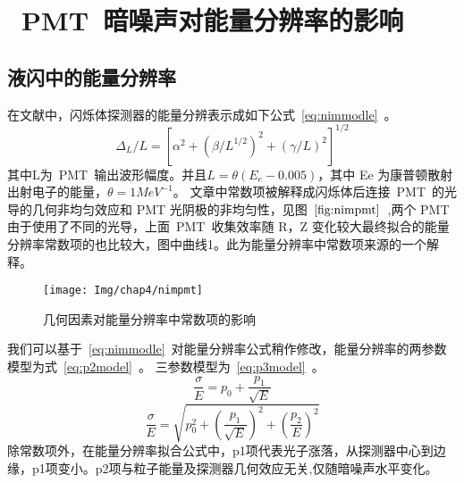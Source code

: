 \section{~PMT~暗噪声对能量分辨率的影响}
\subsection{液闪中的能量分辨率}
在文献\citep{scholermann1980optimizing}中，闪烁体探测器的能量分辨表示成如下公式~\ref{eq:nimmodle}~。
\begin{equation}\label{eq:nimmodle}
\Delta_L /L = [ \alpha^2 + (\beta/L^{1/2})^2+(\gamma/L)^2]^{1/2}
\end{equation}
其中L为~PMT~输出波形幅度。并且$L=\theta(E_e-0.005)$，其中 Ee 为康普顿散射出射电子的能量，$\theta=1 MeV^{-1}$。 文章中常数项被解释成闪烁体后连接~PMT~的光导的几何非均匀效应和 PMT 光阴极的非均匀性，见图~$\ref{fig:nimpmt}$~,两个 PMT 由于使用了不同的光导，上面~PMT~收集效率随 R，Z 变化较大最终拟合的能量分辨率常数项的也比较大，图中曲线1。此为能量分辨率中常数项来源的一个解释。
 \begin{figure}[!htbp]
  \centering
   \texttt{[image: Img/chap4/nimpmt]}
    \caption{几何因素对能量分辨率中常数项的影响}
  \label{fig:nimpmt}
\end{figure}
我们可以基于~\ref{eq:nimmodle}~对能量分辨率公式稍作修改，能量分辨率的两参数模型为式~\ref{eq:p2model}~。
三参数模型为~\ref{eq:p3model}~。
\begin{equation}\label{eq:p2model}
 \frac{\sigma}{E}=p_0+\frac{p_1}{\sqrt{E}}
\end{equation}
\begin{equation}\label{eq:p3model}
  \frac{\sigma}{E}=\sqrt{p_0^2+{(\frac{p_1}{\sqrt{E}})}^2+{(\frac{p_2}{E})}^2}
\end{equation}
除常数项外，在能量分辨率拟合公式中，p1项代表光子涨落，从探测器中心到边缘，p1项变小。p2项与粒子能量及探测器几何效应无关,仅随暗噪声水平变化。
